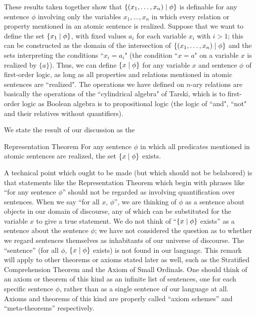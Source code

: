 These results taken together show that $\{(x_1,\ldots,x_n)
\mid \phi\}$ is definable for any sentence $\phi$ involving only the
variables $x_1,\ldots,x_n$ in which every relation
or property
mentioned in an atomic sentence is realized.  Suppose that we want to
define the set $\{x_1 \mid \phi\}$, with fixed values $a_i$ for each
variable $x_i$ with $i > 1$; this can be constructed as the
domain of the intersection of
$\{(x_1,\ldots,x_n) \mid \phi\}$ and the sets interpreting the conditions ``$x_i
= a_i$" (the condition ``$x = a$" on a variable $x$ is realized by $\{a\}$).
Thus, we can define $\{x \mid \phi\}$ for any variable $x$ and sentence $\phi$
of first-order logic, 
as long as all properties and relations mentioned in atomic sentences
are ``realized".  The operations we have defined on $n$-ary relations
are basically the operations of the ``cylindrical algebra" of Tarski,
which is to first-order logic as Boolean algebra is to propositional
logic (the logic of ``and", ``not" and their relatives without
quantifiers).

We state the result of our discussion as the

\pagebreak

\begin{Thm}{Representation Theorem}
 For any sentence $\phi$ in which all
 predicates mentioned in atomic sentences are realized, the set $\{x
 \mid \phi\}$ exists.
\end{Thm}

A technical point which ought to be made (but which should not be
belabored) is that statements like the Representation Theorem which
begin with phrases like ``for any sentence $\phi$'' should not be
regarded as involving quantification over sentences.  When we say
``for all $x$, $\phi$'', we are thinking of $\phi$ as a sentence about
objects in our domain of discourse, any of which can be substituted
for the variable $x$ to give a true statement.  We do not think of
``$\{x \mid \phi\}$ exists'' as a sentence about the sentence $\phi$;
we have not considered the question as to whether we regard sentences
themselves as inhabitants of our universe of discourse.  The
``sentence'' (for all $\phi$, $\{x \mid \phi\}$ exists) is not found
in our language.  This remark will apply to other theorems or axioms
stated later as well, such as the Stratified
Comprehension Theorem and 
the Axiom of Small Ordinals.  One should think
of an axiom or theorem of this kind as an infinite list of sentences, one for
each specific sentence $\phi$, rather than as a single sentence of our language
at all.  Axioms and theorems of this kind are properly called ``axiom
schemes'' and ``meta-theorems'' respectively.


